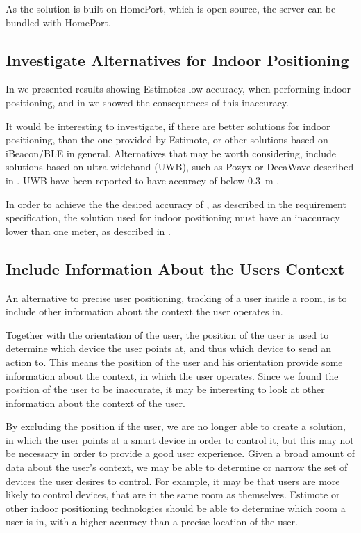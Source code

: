 As the solution is built on HomePort, which is open source, 
the server can be bundled with HomePort.

\subsection{Investigate Alternatives for Indoor Positioning}

In  we presented results showing Estimotes low accuracy, 
when performing indoor positioning, 
and in  we showed the consequences of this inaccuracy.

It would be interesting to investigate, 
if there are better solutions for indoor positioning, 
than the one provided by Estimote, 
or other solutions based on iBeacon/BLE in general. 
Alternatives that may be worth considering, 
include solutions based on ultra wideband (UWB), 
such as Pozyx or DecaWave described in .
UWB have been reported to have accuracy of below \SI{0.3}{\meter} \cite{Liu:4343996}.

In order to achieve the the desired accuracy of , 
as described in the requirement specification, 
the solution used for indoor positioning must have an inaccuracy lower than one meter, 
as described in .

\subsection{Include Information About the Users Context}

An alternative to precise user positioning, 
\ie tracking of a user inside a room, 
is to include other information about the context the user operates in.

Together with the orientation of the user, 
the position of the user is used to determine which device the user points at, 
and thus which device to send an action to. 
This means the position of the user and his orientation provide some information about the context, 
in which the user operates. 
Since we found the position of the user to be inaccurate, 
it may be interesting to look at other information about the context of the user.

By excluding the position if the user, 
we are no longer able to create a solution, 
in which the user points at a smart device in order to control it, 
but this may not be necessary in order to provide a good user experience. 
Given a broad amount of data about the user's context, 
we may be able to determine or narrow the set of devices the user desires to control. 
For example, it may be that users are more likely to control devices, 
that are in the same room as themselves. 
Estimote or other indoor positioning technologies should be able to determine which room a user is in, 
with a higher accuracy than a precise location of the user.

